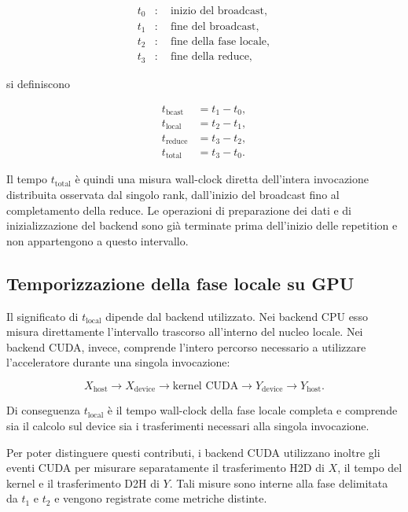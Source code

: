 \begin{align}
t_0 &:\quad \text{inizio del broadcast}, \\
t_1 &:\quad \text{fine del broadcast}, \\
t_2 &:\quad \text{fine della fase locale}, \\
t_3 &:\quad \text{fine della reduce},
\end{align}

si definiscono

\begin{align}
t_{\mathrm{bcast}} &= t_1-t_0, \\
t_{\mathrm{local}} &= t_2-t_1, \\
t_{\mathrm{reduce}} &= t_3-t_2, \\
t_{\mathrm{total}} &= t_3-t_0.
\label{eq:tempi-repetition}
\end{align}

Il tempo $t_{\mathrm{total}}$ è quindi una misura wall-clock diretta
dell'intera invocazione distribuita osservata dal singolo rank, dall'inizio
del broadcast fino al completamento della reduce. Le operazioni di
preparazione dei dati e di inizializzazione del backend sono già terminate
prima dell'inizio delle repetition e non appartengono a questo intervallo.

\subsection{Temporizzazione della fase locale su GPU}

Il significato di $t_{\mathrm{local}}$ dipende dal backend utilizzato.
Nei backend CPU esso misura direttamente l'intervallo trascorso
all'interno del nucleo locale. Nei backend CUDA, invece,
 comprende l'intero percorso necessario a utilizzare
l'acceleratore durante una singola invocazione:

\[
X_{\mathrm{host}}
\longrightarrow
X_{\mathrm{device}}
\longrightarrow
\text{kernel CUDA}
\longrightarrow
Y_{\mathrm{device}}
\longrightarrow
Y_{\mathrm{host}}.
\]

Di conseguenza $t_{\mathrm{local}}$ è il tempo wall-clock della fase locale
completa e comprende sia il calcolo sul device sia i trasferimenti necessari
alla singola invocazione.

Per poter distinguere questi contributi, i backend CUDA utilizzano inoltre
gli eventi CUDA per misurare separatamente il trasferimento H2D di $X$, il tempo
del kernel e il trasferimento D2H di $Y$. Tali misure sono interne alla fase
delimitata da $t_1$ e $t_2$ e vengono registrate come metriche distinte.

